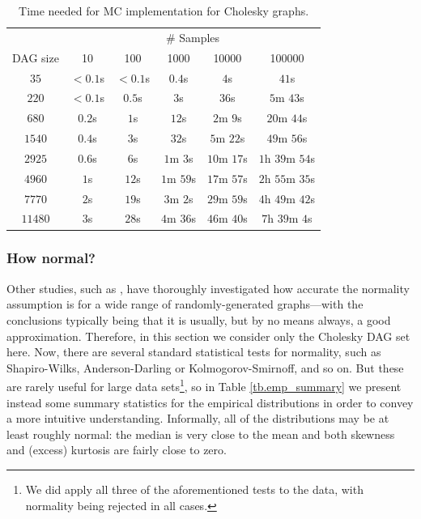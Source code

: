 \documentclass[12pt]{article}
\begin{document}
\begin{table}
	\caption{Time needed for MC implementation for Cholesky graphs.} 
	\begin{center}	
		\begin{tabular}{c c c c c c}
                  \toprule
                  & \multicolumn{5}{c}{\# Samples}     \\
                  \cmidrule{2-6}
                  DAG size & 10 & 100 & 1000 & 10000 & 100000\\
                  \cmidrule{1-6}
                  $35$ & $<0.1$s & $<0.1$s & $0.4$s & $4$s & $41$s\\
                  $220$  & $<0.1$s & $0.5$s & $3$s & $36$s & $5$m $43$s\\
                  $680$ & $0.2$s & $1$s & $12$s & $2$m $9$s & $20$m $44$s\\
                  $1540$ & $0.4$s & $3$s & $32$s & $5$m $22$s & $49$m $56$s\\
                  $2925$ & $0.6$s & $6$s & $1$m $3$s & $10$m $17$s & $1$h $39$m $54$s\\
                  $4960$ & $1$s & $12$s & $1$m $59$s & $17$m $57$s & $2$h $55$m $35$s\\
                  $7770$ & $2$s & $19$s & $3$m $2$s & $29$m $59$s & $4$h $49$m $42$s\\
                  $11480$ & $3$s & $28$s & $4$m $36$s & $46$m $40$s & $7$h $39$m $4$s\\
		\bottomrule
		\end{tabular}
		\label{tb.mc_timings}
	\end{center}	
      \end{table}


\subsubsection{How normal?}
\label{subsubsect.how_normal}

Other studies, such as \cite{can16}, have thoroughly investigated how accurate the normality assumption is for a wide range of randomly-generated graphs---with the conclusions typically being that it is usually, but by no means always, a good approximation. Therefore, in this section we consider only the Cholesky DAG set here. Now, there are several standard statistical tests for normality, such as Shapiro-Wilks, Anderson-Darling or Kolmogorov-Smirnoff, and so on. But these are rarely useful for large data sets\footnote{We did apply all three of the aforementioned tests to the data, with normality being rejected in all cases.}, so in Table \ref{tb.emp_summary} we present instead some summary statistics for the empirical distributions in order to convey a more intuitive understanding. Informally, all of the distributions may be at least roughly normal: the median is very close to the mean and both skewness and (excess) kurtosis are fairly close to zero.
\end{document}
